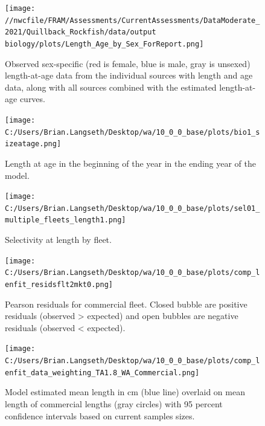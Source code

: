 \documentclass[11pt,
  english,
  letterpaper,
]{article}
\begin{document}
\tagmcend\tagstructend


\begin{figure}
\centering
\texttt{[image: //nwcfile/FRAM/Assessments/CurrentAssessments/DataModerate\_2021/Quillback\_Rockfish/data/output biology/plots/Length\_Age\_by\_Sex\_ForReport.png]}
\caption{Observed sex-specific (red is female, blue is male, gray is unsexed) length-at-age data from the individual sources with length and age data, along with all sources combined with the estimated length-at-age curves.\label{fig:len-age-data}}
\end{figure}

\tagmcend\tagstructend


\begin{figure}
\centering
\texttt{[image: C:/Users/Brian.Langseth/Desktop/wa/10\_0\_0\_base/plots/bio1\_sizeatage.png]}
\caption{Length at age in the beginning of the year in the ending year of the model.\label{fig:len-age-ss}}
\end{figure}

\tagmcend\tagstructend


\begin{figure}
\centering
\texttt{[image: C:/Users/Brian.Langseth/Desktop/wa/10\_0\_0\_base/plots/sel01\_multiple\_fleets\_length1.png]}
\caption{Selectivity at length by fleet.\label{fig:selex}}
\end{figure}

\tagmcend\tagstructend


\begin{figure}
\centering
\texttt{[image: C:/Users/Brian.Langseth/Desktop/wa/10\_0\_0\_base/plots/comp\_lenfit\_residsflt2mkt0.png]}
\caption{Pearson residuals for commercial fleet. Closed bubble are positive residuals (observed \textgreater{} expected) and open bubbles are negative residuals (observed \textless{} expected).\label{fig:com-pearson}}
\end{figure}

\tagmcend\tagstructend


\begin{figure}
\centering
\texttt{[image: C:/Users/Brian.Langseth/Desktop/wa/10\_0\_0\_base/plots/comp\_lenfit\_data\_weighting\_TA1.8\_WA\_Commercial.png]}
\caption{Model estimated mean length in cm (blue line) overlaid on mean length of commercial lengths (gray circles) with 95 percent confidence intervals based on current samples sizes.\label{fig:com-mean-len-fit}}
\end{figure}
\end{document}
